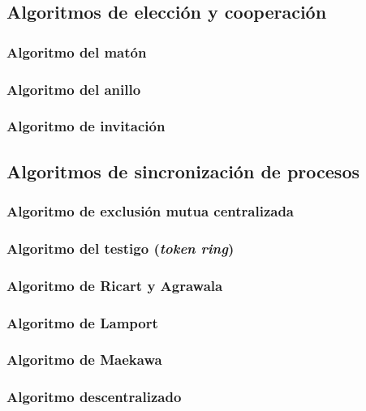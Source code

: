 \documentclass[a4paper, 11pt, titlepage]{article}
\begin{document}
    \subsection{Algoritmos de elección y cooperación}

        \subsubsection{Algoritmo del matón}

        \subsubsection{Algoritmo del anillo}

        \subsubsection{Algoritmo de invitación}

    \subsection{Algoritmos de sincronización de procesos}

        \subsubsection{Algoritmo de exclusión mutua centralizada}

        \subsubsection{Algoritmo del testigo (\textit{token ring})}

        \subsubsection{Algoritmo de Ricart y Agrawala}

        \subsubsection{Algoritmo de Lamport}

        \subsubsection{Algoritmo de Maekawa}

        \subsubsection{Algoritmo descentralizado}
\end{document}
